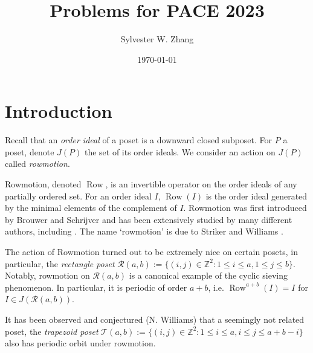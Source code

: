 \documentclass[12pt]{amsart}
\title{Problems for PACE 2023}
\author[S. Zhang]{Sylvester W. Zhang}
\date{\today}
\theoremstyle{plain}
\theoremstyle{definition}
\DeclareMathOperator{\row}{Row}
\begin{document}
\maketitle


\section{Introduction}

Recall that an \emph{order ideal} of a poset is a downward closed subposet. For $P$ a poset, denote $J(P)$ the set of its order ideals. We consider an action on $J(P)$ called \emph{rowmotion}.

Rowmotion, denoted $\row$, is an invertible operator on the order ideals of any partially ordered set. For an order ideal $I$, $\row(I)$ is the order ideal generated by the minimal elements of the complement of $I$. Rowmotion was first introduced by Brouwer and Schrijver \cite{bs74} and has been extensively studied by many different authors, including \cite{rowfirst,fon1993orbits,toggles,Pan09,prorow}. The name `rowmotion' is due to Striker and Williams \cite{prorow}.

The action of Rowmotion turned out to be extremely nice on certain posets, in particular,  the \emph{rectangle poset} $\mathscr{R}(a,b):=\{(i,j)\in\mathbb Z^2:1\le i\le a,1\le j\le b\}$. Notably, rowmotion on $\mathscr{R}(a,b)$ is a canonical example of the cyclic sieving phenomenon. In particular, it is periodic of order $a+b$, i.e. $\row^{a+b}(I)=I$ for $I\in J(\mathscr{R}(a,b))$.

It has been observed and conjectured (N. Williams) that a seemingly not related poset, the \emph{trapezoid poset} $\mathscr{T}(a,b):=\{(i,j)\in\mathbb Z^2:1\le i\le a,i\le j\le a+b-i\}$ also has periodic orbit under rowmotion.
\end{document}
